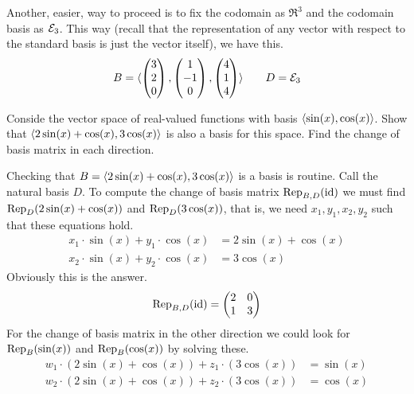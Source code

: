\begin{exercises}
\begin{answer}
      Another, easier, way to proceed is to fix the codomain as $\Re^3$ and
      the codomain basis as $\stdbasis_3$.
      This way (recall that the representation of any vector with respect
      to the standard basis is just the vector itself),
      we have this. 
      \begin{equation*}
        B=\sequence{\colvec{3 \\ 2 \\ 0},
                    \colvec{1 \\ -1 \\ 0},
                    \colvec{4 \\ 1 \\ 4}  }
        \qquad
        D=\stdbasis_3
      \end{equation*}  
    \end{answer}
  \item 
    Conside the vector space of real-valued functions with basis
    \( \sequence{\sin(x),\cos(x)} \).
    Show that \( \sequence{2\sin(x)+\cos(x),3\cos(x)} \)
    is also a basis for this space.
    Find the change of basis matrix in each direction.
    \begin{answer}
      Checking that \( B=\sequence{2\sin(x)+\cos(x),3\cos(x)} \) is a basis
      is routine.
      Call the natural basis $D$.
      To compute the change of basis matrix $\rep{\identity}{B,D}$ we must
      find $\rep{2\sin(x)+\cos(x)}{D}$ and $\rep{3\cos(x)}{D}$, that is,
      we need $x_1,y_1, x_2,y_2$ such that these equations hold.
      \begin{align*}
        x_1\cdot \sin(x)+y_1\cdot\cos(x) &= 2\sin(x)+\cos(x) \\
        x_2\cdot \sin(x)+y_2\cdot\cos(x) &= 3\cos(x) 
      \end{align*}
      Obviously this is the answer.
      \begin{equation*}
        \rep{\identity}{B,D}
        =\begin{pmatrix}
          2  &0  \\
          1  &3
        \end{pmatrix}
      \end{equation*}
      For the change of basis matrix in the other direction we could 
      look for $\rep{\sin(x)}{B}$ and $\rep{\cos(x)}{B}$ by solving these. 
      \begin{align*}
        w_1\cdot (2\sin(x)+\cos(x))+z_1\cdot(3\cos(x)) &= \sin(x) \\
        w_2\cdot (2\sin(x)+\cos(x))+z_2\cdot(3\cos(x)) &= \cos(x) 

\end{align*}
\end{answer}
\end{exercises}
